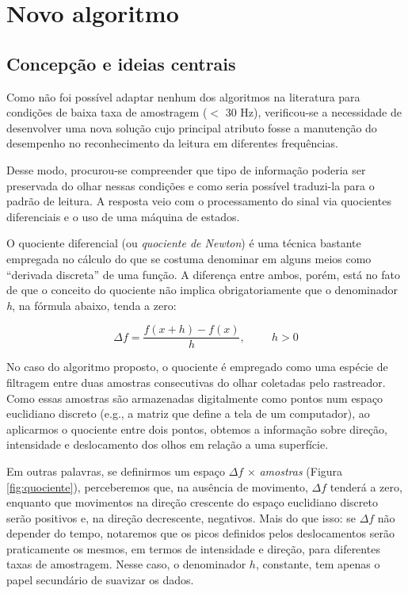 \documentclass[12pt]{article}
\begin{document}
		\clearpage
	\section{Novo algoritmo}
		
		\subsection{Concepção e ideias centrais}
		Como não foi possível adaptar nenhum dos algoritmos na literatura para condições de baixa taxa de amostragem ($<$ 30 Hz), verificou-se a necessidade de desenvolver uma nova solução cujo principal atributo fosse a manutenção do desempenho no reconhecimento da leitura em diferentes frequências.
		
		Desse modo, procurou-se compreender que tipo de informação poderia ser preservada do olhar nessas condições e como seria possível traduzi-la para o padrão de leitura. A resposta veio com o processamento do sinal via quocientes diferenciais e o uso de uma máquina de estados.
		
		O quociente diferencial (ou \textit{quociente de Newton}) \cite{Belding-2008} é uma técnica bastante empregada no cálculo do que se costuma denominar em alguns meios como ``derivada discreta'' de uma função. A diferença entre ambos, porém, está no fato de que o conceito do quociente não implica obrigatoriamente que o denominador \textit{h}, na fórmula abaixo, tenda a zero: 
		
		$$\Delta f = \frac{f(x + h) - f(x)}{h}, \hspace{1cm}h > 0$$
		
		No caso do algoritmo proposto, o quociente é empregado como uma espécie de filtragem entre duas amostras consecutivas do olhar coletadas pelo rastreador. Como essas amostras são armazenadas digitalmente como pontos num espaço euclidiano discreto (e.g., a matriz que define a tela de um computador), ao aplicarmos o quociente entre dois pontos, obtemos a informação sobre direção, intensidade e deslocamento dos olhos em relação a uma superfície.
		
		Em outras palavras, se definirmos um espaço $\Delta f$ $\times$ \textit{amostras} (Figura \ref{fig:quociente}), perceberemos que, na ausência de movimento, $\Delta f$ tenderá a zero, enquanto que movimentos na direção crescente do espaço euclidiano discreto serão positivos e, na direção decrescente, negativos. Mais do que isso: se $\Delta f$ não depender do tempo, notaremos que os picos definidos pelos deslocamentos serão praticamente os mesmos, em termos de intensidade e direção, para diferentes taxas de amostragem. Nesse caso, o denominador $h$, constante, tem apenas o papel secundário de suavizar os dados.
		
\end{document}
